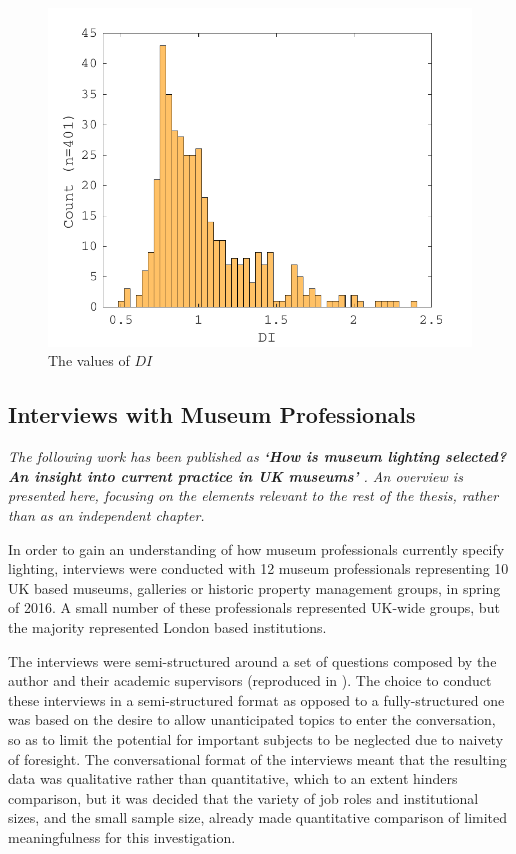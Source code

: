 \begin{figure}[htbp]
\includegraphics[max width=\textwidth]{figs/LitRev/DI.pdf}
\caption{The values of $DI$ }
\label{fig:Houser}
\end{figure}

\subsection{Interviews with Museum Professionals} \label{sec:Interviews}

\textit{The following work has been published as \textbf{`How is museum lighting selected? An insight into current practice in UK museums'} \citep{garside_how_2017}. An overview is presented here, focusing on the elements relevant to the rest of the thesis, rather than as an independent chapter.}

\medskip

In order to gain an understanding of how museum professionals currently specify lighting, interviews were conducted with 12 museum professionals representing 10 UK based museums, galleries or historic property management groups, in spring of 2016. A small number of these professionals represented UK-wide groups, but the majority represented London based institutions.

The interviews were semi-structured around a set of questions composed by the author and their academic supervisors (reproduced in \citet{garside_how_2017}). The choice to conduct these interviews in a semi-structured format as opposed to a fully-structured one was based on the desire to allow unanticipated topics to enter the conversation, so as to limit the potential for important subjects to be neglected due to naivety of foresight. The conversational format of the interviews meant that the resulting data was qualitative rather than quantitative, which to an extent hinders comparison, but it was decided that the variety of job roles and institutional sizes, and the small sample size, already made quantitative comparison of limited meaningfulness for this investigation.

